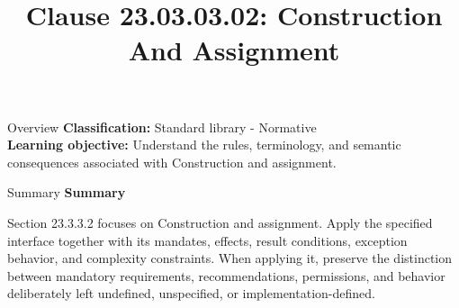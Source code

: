 \documentclass[10pt,letterpaper]{article}
\title{Clause 23.03.03.02: Construction And Assignment}
\author{}
\date{}
\begin{document}
\maketitle
\begin{CornellOverviewBox}{Overview}
\textbf{Classification:} Standard library - Normative\\[2pt]
\textbf{Learning objective:} Understand the rules, terminology, and semantic consequences associated with Construction and assignment.
\end{CornellOverviewBox}\begin{CornellSummaryBox}{Summary}
{\sffamily\bfseries\color{Accent} Summary}\par\vspace{3pt}Section 23.3.3.2 focuses on Construction and assignment. Apply the specified interface together with its mandates, effects, result conditions, exception behavior, and complexity constraints. When applying it, preserve the distinction between mandatory requirements, recommendations, permissions, and behavior deliberately left undefined, unspecified, or implementation-defined.
\end{CornellSummaryBox}
\end{document}
